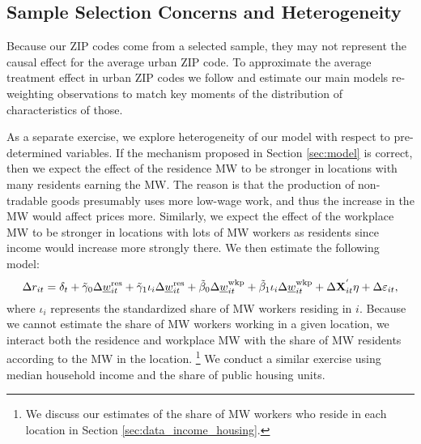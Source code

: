 \subsection{Sample Selection Concerns and Heterogeneity}\label{sec:emp_start_heterogeneity}

Because our ZIP codes come from a selected sample, they may not represent
the causal effect for the average urban ZIP code.
To approximate the average treatment effect in urban ZIP codes we follow
\textcite{Hainmueller2012} and estimate our main models re-weighting 
observations to match key moments of the distribution of characteristics of 
those.

As a separate exercise, we explore heterogeneity of our model with respect
to pre-determined variables.
If the mechanism proposed in Section \ref{sec:model} is correct, then we
expect the effect of the residence MW to be stronger in locations with many 
residents earning the MW.
The reason is that the production of non-tradable goods presumably uses more
low-wage work, and thus the increase in the MW would affect prices more.
Similarly, we expect the effect of the workplace MW to be stronger in locations
with lots of MW workers as residents since income would increase more 
strongly there.
We then estimate the following model:
\begin{equation}\label{eq:fd_heterogeneity}
    \Delta r_{it} = \delta_t
                  + \tilde\gamma_0 \Delta \underline{w}^{\text{res}}_{it}
                  + \tilde\gamma_1 \iota_i \Delta \underline{w}^{\text{res}}_{it}
                  + \tilde\beta_0 \Delta \underline{w}^{\text{wkp}}_{it}
                  + \tilde\beta_1 \iota_i \Delta \underline{w}^{\text{wkp}}_{it}
                  + \Delta \mathbf{X}^{'}_{it}\eta
                  + \Delta \varepsilon_{it} ,
\end{equation}
where $\iota_i$ represents the standardized share of MW workers residing in $i$.
Because we cannot estimate the share of MW workers working in a given location,
we interact both the residence and workplace MW with the share of MW residents
according to the MW in the location.%
\footnote{We discuss our estimates of the share of MW workers who reside in each 
location in Section \ref{sec:data_income_housing}.}
We conduct a similar exercise using median household income and the share of 
public housing units.
